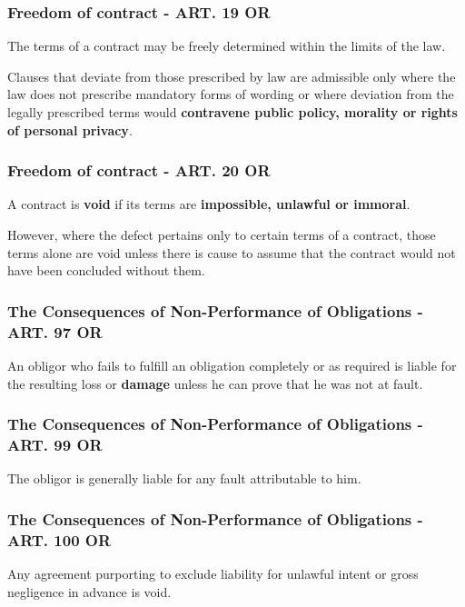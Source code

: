 \subsubsection{Freedom of contract - ART. 19 OR}
\begin{compactenum}
	\item The terms of a contract may be freely determined within the limits of the law.
	\item Clauses that deviate from those prescribed by law are admissible only	where the law does not prescribe mandatory forms of wording or where deviation from the legally prescribed terms would \textbf{contravene public policy, morality or rights of personal privacy}.
\end{compactenum}

\subsubsection{Freedom of contract - ART. 20 OR}
\begin{compactenum}
	\item A contract is \textbf{void} if its terms are \textbf{impossible, unlawful or immoral}.
	\item However, where the defect pertains only to certain terms of a contract, those terms alone are void unless there is cause to assume that the contract would not have been concluded without them.
\end{compactenum}

\subsubsection{The Consequences of Non-Performance of Obligations - ART. 97 OR}
An obligor who fails to fulfill an obligation completely or as required is liable for the resulting loss or \textbf{damage} unless he can prove that he was not at fault.

\subsubsection{The Consequences of Non-Performance of Obligations - ART. 99 OR}
\begin{compactenum}
	\item The obligor is generally liable for any fault attributable to him.
\end{compactenum}

\subsubsection{The Consequences of Non-Performance of Obligations - ART. 100 OR}
\begin{compactenum}
	\item Any agreement purporting to exclude liability for unlawful intent or gross negligence in advance is void.
\end{compactenum}

